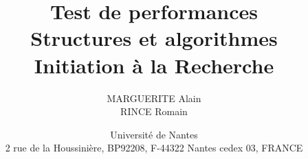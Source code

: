 \documentclass[11pt,a4paper,utf8x]{report}
\title{Test de performances \\ Structures et algorithmes\\ Initiation à la Recherche}
\author{MARGUERITE Alain\\ RINCE Romain}
\date{Université de Nantes \\ 2 rue de la Houssinière, BP92208, F-44322 Nantes cedex 03, FRANCE}
\begin{document}
\maketitle
\renewcommand{\labelitemi}{$\bullet$} 

\clearpage

\tableofcontents
\clearpage


%
%




\end{document}
